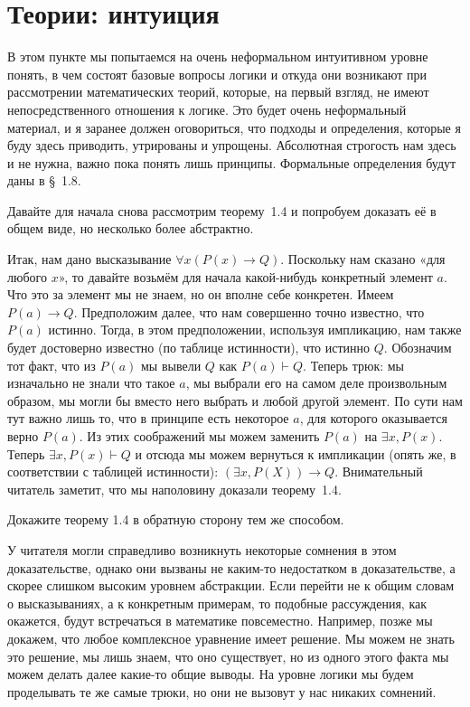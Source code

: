 \section{Теории: интуиция}

В этом пункте мы попытаемся на очень неформальном интуитивном уровне понять, в чем состоят базовые вопросы логики и откуда они возникают при рассмотрении математических теорий, которые, на первый взгляд, не имеют непосредственного отношения к логике. Это будет очень неформальный материал, и я заранее должен оговориться, что подходы и определения, которые я буду здесь приводить, утрированы и упрощены. Абсолютная строгость нам здесь и не нужна, важно пока понять лишь принципы. Формальные определения будут даны в \S~1.8.

Давайте для начала снова рассмотрим теорему~1.4 и попробуем доказать её в общем виде, но несколько более абстрактно.

Итак, нам дано высказывание $\forall x (P(x)\to Q)$. Поскольку нам сказано «для любого $x$», то давайте возьмём для начала какой-нибудь конкретный элемент $a$. Что это за элемент мы не знаем, но он вполне себе конкретен. Имеем $P(a)\to Q$. Предположим далее, что нам совершенно точно известно, что $P(a)$ истинно. Тогда, в этом предположении, используя импликацию, нам также будет достоверно известно (по таблице истинности), что истинно $Q$. Обозначим тот факт, что из $P(a)$ мы вывели $Q$ как $P(a)\vdash Q$. Теперь трюк: мы изначально не знали что такое $a$, мы выбрали его на самом деле произвольным образом, мы могли бы вместо него выбрать и любой другой элемент. По сути нам тут важно лишь то, что  в принципе есть некоторое $a$, для которого оказывается верно $P(a)$. Из этих соображений мы можем заменить $P(a)$ на $\exists x, P(x)$. Теперь $\exists x, P(x) \vdash Q$ и отсюда мы можем вернуться к импликации (опять же, в соответствии с таблицей истинности): $(\exists x, P(X))\to Q$. Внимательный читатель заметит, что мы наполовину доказали теорему~1.4.

\begin{exercise}
Докажите теорему 1.4 в обратную сторону тем же способом.
\end{exercise}

У читателя могли справедливо возникнуть некоторые сомнения в этом доказательстве, однако они вызваны не каким-то недостатком в доказательстве, а скорее слишком высоким уровнем абстракции. Если перейти не к общим словам о высказываниях, а к конкретным примерам, то подобные рассуждения, как окажется, будут встречаться в математике повсеместно. Например, позже мы докажем, что любое комплексное уравнение имеет решение. Мы можем не знать это решение, мы лишь знаем, что оно существует, но из одного этого факта мы можем делать далее какие-то общие выводы. На уровне логики мы будем проделывать те же самые трюки, но они не вызовут у нас никаких сомнений.

